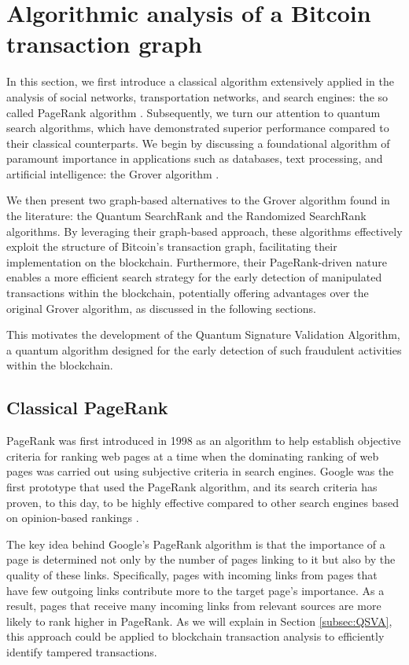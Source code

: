 \documentclass[nofootinbib,aps,prd,reprint,superscriptaddress,floatfix]{revtex4-2}
\begin{document}
\section{Algorithmic analysis of a Bitcoin transaction graph}\label{sec:Algorithms}

In this section, we first introduce a classical algorithm extensively applied in the analysis of social networks, transportation networks, and search engines: the so called PageRank algorithm \cite{Brin1,Brin2,Brin3}. Subsequently, we turn our attention to quantum search algorithms, which have demonstrated superior performance compared to their classical counterparts. We begin by discussing a foundational algorithm of paramount importance in applications such as databases, text processing, and artificial intelligence: the Grover algorithm \cite{Grover}.

We then present two graph-based alternatives to the Grover algorithm found in the literature: the Quantum SearchRank \cite{Searchrank} and the Randomized SearchRank \cite{Randomized} algorithms. By leveraging their graph-based approach, these algorithms effectively exploit the structure of Bitcoin’s transaction graph, facilitating their implementation on the blockchain. Furthermore, their PageRank-driven nature enables a more efficient search strategy for the early detection of manipulated transactions within the blockchain, potentially offering advantages over the original Grover algorithm, as discussed in the following sections.

This motivates the development of the Quantum Signature Validation Algorithm, a quantum algorithm designed for the early detection of such fraudulent activities within the blockchain.

\subsection{Classical PageRank}\label{subsec:Classical_PageRank}

PageRank was first introduced in 1998 \cite{Brin1} as an algorithm to help establish objective criteria for ranking web pages at a time when the dominating ranking of web pages was carried out using subjective criteria in search engines. Google was the first prototype that used the PageRank algorithm, and its search criteria has proven, to this day, to be highly effective compared to other search engines based on opinion-based rankings \cite{Brin3}. 

The key idea behind Google's PageRank algorithm is that the importance of a page is determined not only by the number of pages linking to it but also by the quality of these links. Specifically, pages with incoming links from pages that have few outgoing links contribute more to the target page's importance. As a result, pages that receive many incoming links from relevant sources are more likely to rank higher in PageRank. As we will explain in Section \ref{subsec:QSVA}, this approach could be applied to blockchain transaction analysis to efficiently identify tampered transactions.
\end{document}
